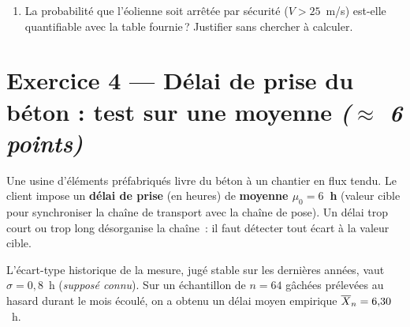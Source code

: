 \begin{enumerate}
  \item La probabilité que l'éolienne soit arrêtée par sécurité ($V > 25$~m/s) est-elle quantifiable avec la table fournie\,? Justifier sans chercher à calculer.

\end{enumerate}

\bigskip

\section*{Exercice 4 --- Délai de prise du béton : test sur une moyenne \hfill {\normalfont \itshape ($\approx$ 6 points)}}

Une usine d'éléments préfabriqués livre du béton à un chantier en flux tendu. Le client impose un \textbf{délai de prise} (en heures) de \textbf{moyenne $\mu_0 = 6$~h} (valeur cible pour synchroniser la chaîne de transport avec la chaîne de pose). Un délai trop court ou trop long désorganise la chaîne~: il faut détecter tout écart à la valeur cible.

\medskip

L'écart-type historique de la mesure, jugé stable sur les dernières années, vaut $\sigma = 0{,}8$~h (\emph{supposé connu}). Sur un échantillon de $n = 64$ gâchées prélevées au hasard durant le mois écoulé, on a obtenu un délai moyen empirique $\overline{X}_n = 6{,}30$~h.

\medskip

